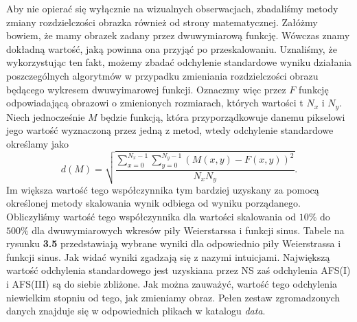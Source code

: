 Aby nie opierać się wyłącznie na wizualnych obserwacjach, zbadaliśmy
metody zmiany rozdzielczości obrazka również od strony matematycznej. Załóżmy
bowiem, że mamy obrazek zadany przez dwuwymiarową funkcję. Wówczas znamy
dokładną wartość, jaką powinna ona przyjąć po przeskalowaniu. Uznaliśmy, że
wykorzystując ten fakt, możemy zbadać odchylenie standardowe wyniku działania
poszczególnych algorytmów w przypadku zmieniania rozdzielczości obrazu będącego
wykresem dwuwyimarowej funkcji. Oznaczmy więc przez $F$ funkcję odpowiadającą
obrazowi o zmienionych rozmiarach, których wartości t $N_x$ i $N_y$. Niech
jednocześnie $M$ będzie funkcją, która przyporządkowuje danemu pikselowi jego
wartość wyznaczoną przez jedną z metod, wtedy odchylenie standardowe określamy
jako
$$d(M)=\sqrt{\frac{\sum_{x=0}^{N_x-1}{\sum_{y=0}^{N_y-1}{(M(x,y)-F(x,y))^2}}}{N_xN_y}}.$$
Im większa wartość tego współczynnika tym bardziej uzyskany za pomocą określonej
metody skalowania wynik odbiega od wyniku porządanego. Obliczyliśmy wartość tego
współczynnika dla wartości skalowania od $10\%$ do $500\%$ dla dwuwymiarowych
wkresów piły Weierstarssa i funkcji sinus. Tabele na rysunku \textbf{3.5}
przedstawiają wybrane wyniki dla odpowiednio piły Weierstrassa i funkcji sinus.
Jak widać wyniki zgadzają się z nazymi intuicjami. Największą wartość odchylenia
standardowego jest uzyskiana przez NS zaś odchylenia AFS(I) i AFS(III) są do siebie zbliżone. Jak można
zauważyć, wartość tego odchylenia niewielkim stopniu od tego, jak zmieniamy obraz.
Pełen zestaw zgromadzonych danych znajduje się w odpowiednich plikach w katalogu
\textit{data}.
